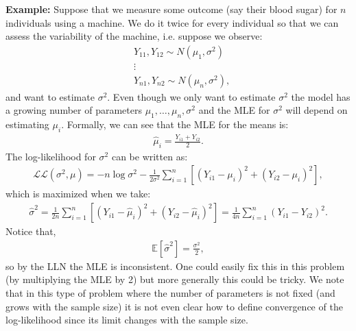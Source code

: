 \documentclass[twoside,12pt]{article}
\begin{document}
{\bf Example: } Suppose that we measure some outcome (say their blood sugar) for $n$ individuals using a machine. We do it twice for every individual so that we can assess the variability of the machine, i.e. suppose we observe:
\begin{align*}
&Y_{11}, Y_{12} \sim N(\mu_1,\sigma^2) \\
&\vdots \\
&Y_{n1}, Y_{n2} \sim N(\mu_n, \sigma^2),
\end{align*}
and want to estimate $\sigma^2$. Even though we only want to estimate $\sigma^2$ the model has a growing number of parameters $\mu_1,\ldots,\mu_n, \sigma^2$ and the MLE for $\sigma^2$ will depend on estimating $\mu_i$.  Formally, we can see that the MLE for the means is:
\begin{align*}
\widehat{\mu}_i = \frac{Y_{i1} + Y_{i2}}{2}.
\end{align*}
The log-likelihood for $\sigma^2$ can be written as:
\begin{align*}
\mathcal{LL}(\sigma^2,\mu) = - n \log \sigma^2 - \frac{1}{2\sigma^2} \sum_{i=1}^n \left[ (Y_{i1} - \mu_i)^2 + (Y_{i2} - \mu_i)^2 \right],
\end{align*}
which is maximized when we take:
\begin{align*}
\widehat{\sigma}^2 =\frac{1}{2n} \sum_{i=1}^n \left[ (Y_{i1} - \widehat{\mu}_i)^2 + (Y_{i2} - \widehat{\mu}_i)^2 \right] = \frac{1}{4n} \sum_{i=1}^n (Y_{i1} - Y_{i2})^2.
\end{align*}
Notice that, 
\begin{align*}
\mathbb{E}[\widehat{\sigma}^2] = \frac{\sigma^2}{2},
\end{align*}
so by the LLN the MLE is inconsistent. One could easily fix this in this problem (by multiplying the MLE by 2) but more generally this could be tricky. We note that in this type of problem where the number of parameters is not fixed (and grows with the sample size) it is not even clear how to define convergence of the log-likelihood since its limit changes with the sample size.
\end{document}
